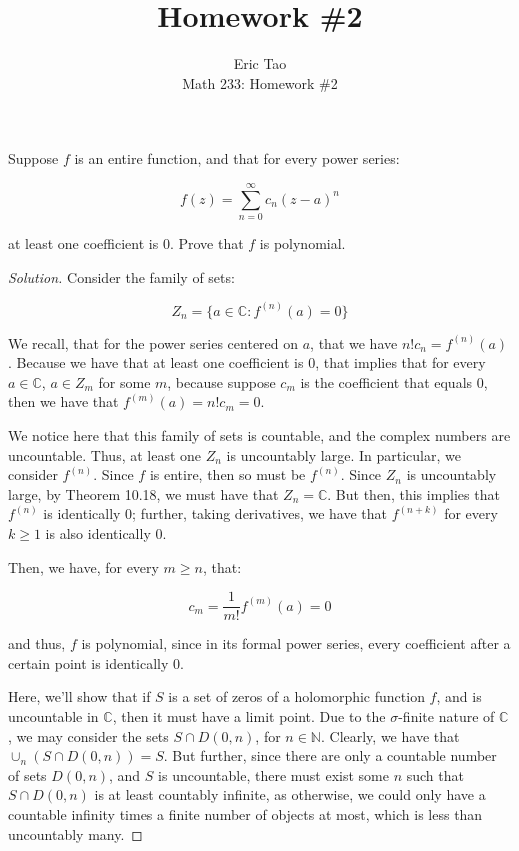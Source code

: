 \documentclass[10pt]{article}
\newenvironment{problem}[2][]{\begin{trivlist}
\item[\hskip \labelsep {\bfseries #1}\hskip \labelsep {\bfseries #2.}]}{\end{trivlist}}
\begin{document}
 
\title{Homework \#2}
\author{Eric Tao\\
Math 233: Homework \#2}
\maketitle

\begin{problem}{Question 1}
Suppose $f$ is an entire function, and that for every power series:

$$ f(z) = \sum_{n=0}^\infty c_n (z - a)^n$$

at least one coefficient is 0. Prove that $f$ is polynomial.

\end{problem}
\begin{proof}[Solution]

Consider the family of sets:

$$Z_n = \{ a \in \mathbb{C} : f^{(n)}(a) = 0 \}$$

We recall, that for the power series centered on $a$, that we have $n! c_n = f^{(n)}(a)$. Because we have that at least one coefficient is 0, that implies that for every $a \in \mathbb{C}$, $a \in Z_m$ for some $m$, because suppose $c_m$ is the coefficient that equals 0, then we have that $f^{(m)}(a) = n! c_m = 0$.

We notice here that this family of sets is countable, and the complex numbers are uncountable. Thus, at least one $Z_n$ is uncountably large. In particular, we consider $f^{(n)}$. Since $f$ is entire, then so must be $f^{(n)}$. Since $Z_n$ is uncountably large, by Theorem 10.18, we must have that $Z_n = \mathbb{C}$. But then, this implies that $f^{(n)}$ is identically 0; further, taking derivatives, we have that $f^{(n+k)}$ for every $k \geq 1$ is also identically 0. 

Then, we have, for every $m \geq n$, that:

$$c_m = \frac{1}{m!} f^{(m)}(a) = 0 $$

and thus, $f$ is polynomial, since in its formal power series, every coefficient after a certain point is identically 0.

Here, we'll show that if $S$ is a set of zeros of a holomorphic function $f$, and is uncountable in $\mathbb{C}$, then it must have a limit point. Due to the $\sigma$-finite nature of $\mathbb{C}$, we may consider the sets $S \cap D(0,n)$, for $n \in \mathbb{N}$. Clearly, we have that $\cup_n \left( S \cap D(0,n) \right) = S$. But further, since there are only a countable number of sets $D(0,n)$, and $S$ is uncountable, there must exist some $n$ such that $S \cap D(0,n)$ is at least countably infinite, as otherwise, we could only have a countable infinity times a finite number of objects at most, which is less than uncountably many. 


\end{proof}
\end{document}
